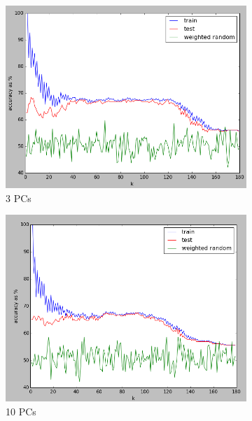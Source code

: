 \documentclass[]{article}
\begin{document}
  \begin{figure}[H]
    \centering
    \begin{subfigure}{.33\textwidth}
      \centering
      \includegraphics[width=1\linewidth]{3pcs.png}
      \caption{3 PCs}
    \end{subfigure}
    \begin{subfigure}{.33\textwidth}
      \centering
      \includegraphics[width=1\linewidth]{10pcs.png}
      \caption{10 PCs}
    \end{subfigure}
    \begin{subfigure}{.32\textwidth}
      \centering

\end{subfigure}
\end{figure}
\end{document}
